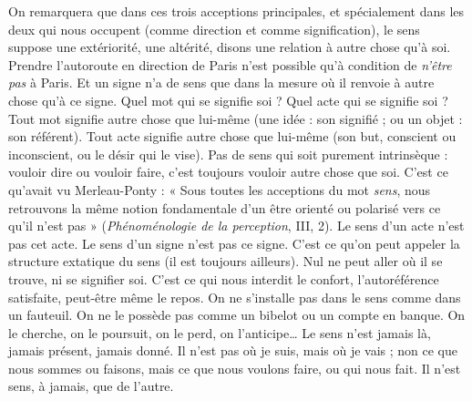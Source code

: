 On remarquera que dans ces trois acceptions principales, et spécialement
dans les deux qui nous occupent (comme direction et comme signification), le
sens suppose une extériorité, une altérité, disons une relation à autre chose qu’à
soi. Prendre l’autoroute en direction de Paris n’est possible qu’à condition de
{\it n'être pas} à Paris. Et un signe n’a de sens que dans la mesure où il renvoie à
autre chose qu’à ce signe. Quel mot qui se signifie soi ? Quel acte qui se signifie
soi ? Tout mot signifie autre chose que lui-même (une idée : son signifié ; ou
un objet : son référent). Tout acte signifie autre chose que lui-même (son but,
conscient ou inconscient, ou le désir qui le vise). Pas de sens qui soit purement
intrinsèque : vouloir dire ou vouloir faire, c’est toujours vouloir autre chose que
soi. C’est ce qu'avait vu Merleau-Ponty : « Sous toutes les acceptions du mot
{\it sens}, nous retrouvons la même notion fondamentale d’un être orienté ou polarisé
vers ce qu'il n’est pas » ({\it Phénoménologie de la perception}, III, 2). Le sens
d’un acte n’est pas cet acte. Le sens d’un signe n’est pas ce signe. C’est ce qu’on
peut appeler la structure extatique du sens (il est toujours ailleurs). Nul ne peut
aller où il se trouve, ni se signifier soi. C’est ce qui nous interdit le confort,
l’autoréférence satisfaite, peut-être même le repos. On ne s’installe pas dans le
sens comme dans un fauteuil. On ne le possède pas comme un bibelot ou un
compte en banque. On le cherche, on le poursuit, on le perd, on l’anticipe…
Le sens n’est jamais là, jamais présent, jamais donné. Il n’est pas où je suis, mais
où je vais ; non ce que nous sommes ou faisons, mais ce que nous voulons faire,
ou qui nous fait. Il n’est sens, à jamais, que de l’autre.

